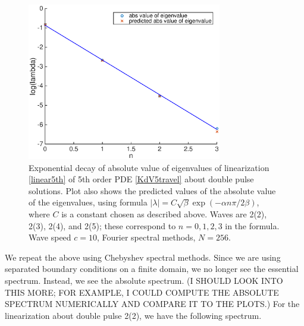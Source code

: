 \documentclass[12pt]{article}
\begin{document}
\begin{figure}[H]
	\includegraphics[width=8.5cm]{decayeigenvalue}
	\caption{Exponential decay of absolute value of eigenvalues of linearization \eqref{linear5th} of 5th order PDE \eqref{KdV5travel} about double pulse solutions. Plot also shows the predicted values of the absolute value of the eigenvalues, using formula $|\lambda| = C \sqrt{\beta}\exp{(-\alpha n \pi / 2 \beta)}$, where $C$ is a constant chosen as described above. Waves are 2(2), 2(3), 2(4), and 2(5); these correspond to $n = 0, 1, 2, 3$ in the formula. Wave speed $c = 10$, Fourier spectral methods, $N = 256$.}
\end{figure}

We repeat the above using Chebyshev spectral methods. Since we are using separated boundary conditions on a finite domain, we no longer see the essential spectrum. Instead, we see the absolute spectrum. (I SHOULD LOOK INTO THIS MORE; FOR EXAMPLE, I COULD COMPUTE THE ABSOLUTE SPECTRUM NUMERICALLY AND COMPARE IT TO THE PLOTS.) For the linearization about double pulse 2(2), we have the following spectrum.
\end{document}

